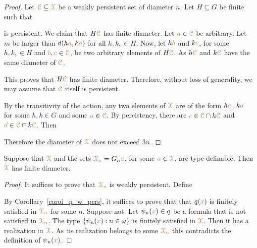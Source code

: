 \begin{proof}
  Let ${\color{brown}\EuScript C}\subseteq{\color{brown}\EuScript X}$ be a weakly persistent set of diameter $n$.
  Let $H\subseteq G$ be finite such that 


  is persistent.
  We claim that $H{\color{brown}\EuScript C}$ has finite diameter.
  Let ${\color{brown} a}\in{\color{brown}\EuScript C}$ be arbitrary.
  Let $m$ be larger than $d(h{\color{brown} a}, k{\color{brown} a})$ for all $h,k,\in H$.
  Now, let $h{\color{brown} b}$ and $k{\color{brown} c}$, for some $h,k,\in H$ and ${\color{brown} b},{\color{brown} c}\in{\color{brown}\EuScript C}$, be two arbitrary elements of $H{\color{brown}\EuScript C}$.
  As $h{\color{brown}\EuScript C}$ and $k{\color{brown}\EuScript C}$ have the same diameter of ${\color{brown}\EuScript C}$, 



  This proves that $H{\color{brown}\EuScript C}$ has finite diameter.
  Therefore, without loss of generality, we may assume that ${\color{brown}\EuScript C}$ itself is persistent.
  
  By the transitivity of the action, any two elements of ${\color{brown}\EuScript X}$ are of the form $h{\color{brown} a}$, $k{\color{brown} a}$ for some $h,k\in G$ and some ${\color{brown} a}\in{\color{brown}\EuScript C}$.
  By percistency, there are ${\color{brown} c}\in{\color{brown}\EuScript C}\cap h{\color{brown}\EuScript C}$ and ${\color{brown} d}\in{\color{brown}\EuScript C}\cap k{\color{brown}\EuScript C}$.
  Then 



  Therefore the diameter of ${\color{brown}\EuScript X}$ does not exceed $3n$.
\end{proof}

\begin{theorem}
  Suppose that ${\color{brown}\EuScript X}$ and the sets ${\color{brown}\EuScript X_n}=G_n{\color{brown} a}$, for some ${\color{brown} a}\in{\color{brown}\EuScript X}$, are type-definable.
  Then ${\color{brown}\EuScript X}$ has finite diameter.
\end{theorem}

\begin{proof}
  It suffices to prove that ${\color{brown}\EuScript X_n}$ is weakly persistent.
  Define

  
  By Corollary~\ref{corol_q_w_pers}, it suffices to prove that that $q({\color{brown} x})$ is finitely satisfied in $\color{brown}\EuScript X_n$ for some $n$.
  Suppose not. 
  Let $\psi_n({\color{brown} x})\in q$ be a formula that is not satisfied in $\color{brown}\EuScript X_n$.
  The type $\{\psi_n({\color{brown} x}):n\in\omega\}$ is finitely satisfied in ${\color{brown}\EuScript X}$.
  Then it has a realization in ${\color{brown}\EuScript X}$. 
  As tis realization belongs to some ${\color{brown}\EuScript X_n}$ this contradicts the definition of $\psi_n({\color{brown} x})$. 
\end{proof}

